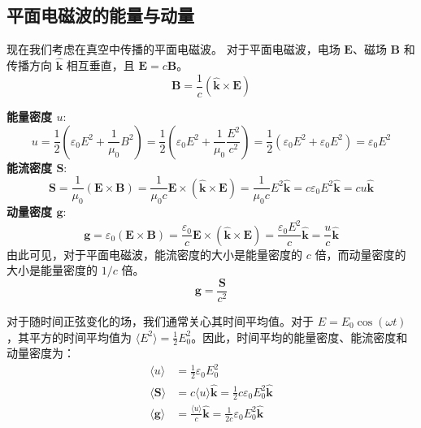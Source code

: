 \documentclass[fontset=none]{ctexart}
\begin{document}
\subsection{平面电磁波的能量与动量}
现在我们考虑在真空中传播的平面电磁波。
对于平面电磁波，电场 $\bm{E}$、磁场 $\bm{B}$ 和传播方向 $\hat{\bm{k}}$ 相互垂直，且 $\bm{E} = c\bm{B}$。
\begin{equation}
    \bm{B} = \frac{1}{c}(\hat{\bm{k}} \times \bm{E})
\end{equation}

\textbf{能量密度 $u$}:
\begin{equation}
    u = \frac{1}{2}(\varepsilon_0 E^2 + \frac{1}{\mu_0}B^2) = \frac{1}{2}\left(\varepsilon_0 E^2 + \frac{1}{\mu_0}\frac{E^2}{c^2}\right) = \frac{1}{2}(\varepsilon_0 E^2 + \varepsilon_0 E^2) = \varepsilon_0 E^2
\end{equation}
\textbf{能流密度 $\bm{S}$}:
\begin{equation}
    \bm{S} = \frac{1}{\mu_0}(\bm{E} \times \bm{B}) = \frac{1}{\mu_0 c}\bm{E} \times (\hat{\bm{k}} \times \bm{E}) = \frac{1}{\mu_0 c} E^2 \hat{\bm{k}} = c \varepsilon_0 E^2 \hat{\bm{k}} = c u \hat{\bm{k}}
\end{equation}
\textbf{动量密度 $\bm{g}$}:
\begin{equation}
    \bm{g} = \varepsilon_0(\bm{E} \times \bm{B}) = \frac{\varepsilon_0}{c}\bm{E} \times (\hat{\bm{k}} \times \bm{E}) = \frac{\varepsilon_0 E^2}{c}\hat{\bm{k}} = \frac{u}{c}\hat{\bm{k}}
\end{equation}
由此可见，对于平面电磁波，能流密度的大小是能量密度的 $c$ 倍，而动量密度的大小是能量密度的 $1/c$ 倍。
\begin{equation}
    \bm{g} = \frac{\bm{S}}{c^2}
\end{equation}

对于随时间正弦变化的场，我们通常关心其时间平均值。对于 $E = E_0 \cos(\omega t)$，其平方的时间平均值为 $\langle E^2 \rangle = \frac{1}{2}E_0^2$。因此，时间平均的能量密度、能流密度和动量密度为：
\begin{equation}
\begin{aligned}
    \langle u \rangle &= \frac{1}{2}\varepsilon_0 E_0^2 \\
    \langle \bm{S} \rangle &= c \langle u \rangle \hat{\bm{k}} = \frac{1}{2}c\varepsilon_0 E_0^2 \hat{\bm{k}} \\
    \langle \bm{g} \rangle &= \frac{\langle u \rangle}{c} \hat{\bm{k}} = \frac{1}{2c}\varepsilon_0 E_0^2 \hat{\bm{k}}
\end{aligned}
\end{equation}
\end{document}
